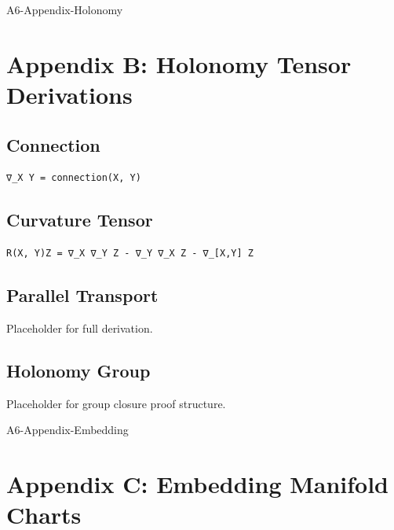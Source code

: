 \documentclass[11pt]{article}
\begin{document}
\newpage


\begin{citationmembrane}{A6-Appendix-Holonomy}
\end{citationmembrane}

\section{Appendix B: Holonomy Tensor Derivations}

\subsection{Connection}
\begin{verbatim}
∇_X Y = connection(X, Y)
\end{verbatim}

\subsection{Curvature Tensor}
\begin{verbatim}
R(X, Y)Z = ∇_X ∇_Y Z - ∇_Y ∇_X Z - ∇_[X,Y] Z
\end{verbatim}

\subsection{Parallel Transport}
Placeholder for full derivation.

\subsection{Holonomy Group}
Placeholder for group closure proof structure.

\newpage


\begin{citationmembrane}{A6-Appendix-Embedding}
\end{citationmembrane}

\section{Appendix C: Embedding Manifold Charts}
\end{document}
